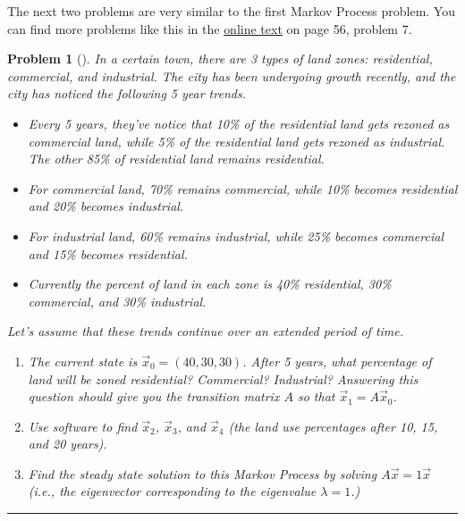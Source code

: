 \documentclass[letterpaper,oneside]{book}%
\newcommand{\onlinetext}{https://content.byui.edu/file/c2f91762-7a1e-4d0b-a1ae-8d5f5f548e17/1/341-Book.pdf}
\theoremstyle{plain}
\theoremstyle{box}
\theoremstyle{problem}
\newtheorem{problemnum}{Problem}[chapter]
\newenvironment{problem}[1][]{\begin{problemnum}[#1]}{\end{problemnum}\nopagebreak\hrule\bigskip}
\begin{document}
The next two problems are very similar to the first Markov Process problem.  You can find more problems like this in the \href{\onlinetext}{online text} on page 56, problem 7.  
\begin{problem}
In a certain town, there are 3 types of land zones: residential, commercial, and industrial. 
The city has been undergoing growth recently, and the city has noticed the following 5 year trends.  
\begin{itemize}
 \item Every 5 years, they've notice that 10\% of the residential land gets rezoned as commercial land, while 5\% of the residential land gets rezoned as industrial.  The other 85\% of residential land remains residential.  
 \item For commercial land, 70\% remains commercial, while 10\% becomes residential and 20\% becomes industrial. 
 \item For industrial land, 60\% remains industrial, while 25\% becomes commercial and 15\% becomes residential. 
 \item Currently the percent of land in each zone is 40\% residential, 30\% commercial, and 30\% industrial. 
\end{itemize}
Let's assume that these trends continue over an extended period of time.  
\begin{enumerate}
 \item The current state is $\vec x_0 = (40,30,30)$. After 5 years, what percentage of land will be zoned residential? Commercial? Industrial?  Answering this question should give you the transition matrix $A$ so that $\vec x_1=A\vec x_0$. 
 \item Use software to find $\vec x_2$, $\vec x_3$, and $\vec x_4$ (the land use percentages after 10, 15, and 20 years).  
 \item Find the steady state solution to this Markov Process by solving $A\vec x = 1\vec x$ (i.e., the eigenvector corresponding to the eigenvalue $\lambda =1$.)
\end{enumerate}
\end{problem}
\end{document}
